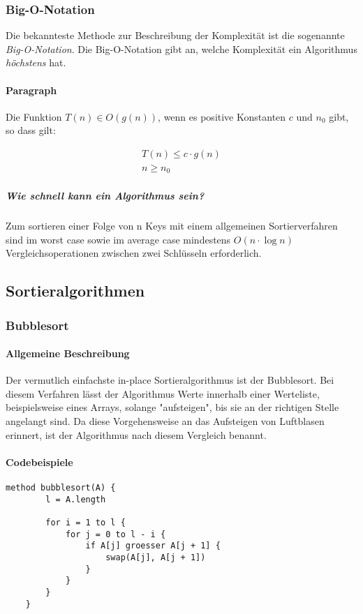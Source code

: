 \documentclass{article}
\begin{document}
	\subsubsection{Big-O-Notation}
	Die bekannteste Methode zur Beschreibung der Komplexität ist die sogenannte \textit{Big-O-Notation}. Die Big-O-Notation gibt an, welche Komplexität ein Algorithmus \textit{höchstens} hat.
	
	\paragraph{Paragraph}
	Die Funktion $T(n) \in O(g(n))$, wenn es positive Konstanten $c$ und $n_0$ gibt, so dass gilt: 

	\begin{align*}
		T(n) \leq c \cdot g(n) \\
		n \geq n_0
	\end{align*}

	\subparagraph{Wie schnell kann ein Algorithmus sein?}
	Zum sortieren einer Folge von n Keys mit einem allgemeinen Sortierverfahren sind im worst case sowie im average case mindestens \textit{$O(n \cdot \log{n})$} Vergleichsoperationen zwischen zwei Schlüsseln erforderlich.

	\subsection{Sortieralgorithmen}
	\subsubsection{Bubblesort}
	\paragraph{Allgemeine Beschreibung}
	Der vermutlich einfachste in-place Sortieralgorithmus ist der Bubblesort. Bei diesem Verfahren lässt der Algorithmus Werte innerhalb einer Werteliste, beispielsweise eines Arrays, solange "aufsteigen", bis sie an der richtigen Stelle angelangt sind. Da diese Vorgehensweise an das Aufsteigen von Luftblasen erinnert, ist der Algorithmus nach diesem Vergleich benannt.

	\paragraph{Codebeispiele}
	\begin{lstlisting}[caption=Der Bubblesort-Algorithmus in einfachem Pseudocode]
	method bubblesort(A) {
		l = A.length

		for i = 1 to l {
			for j = 0 to l - i {
				if A[j] groesser A[j + 1] {
					swap(A[j], A[j + 1])
				}
			}
		}
	}
	\end{lstlisting}
\end{document}
